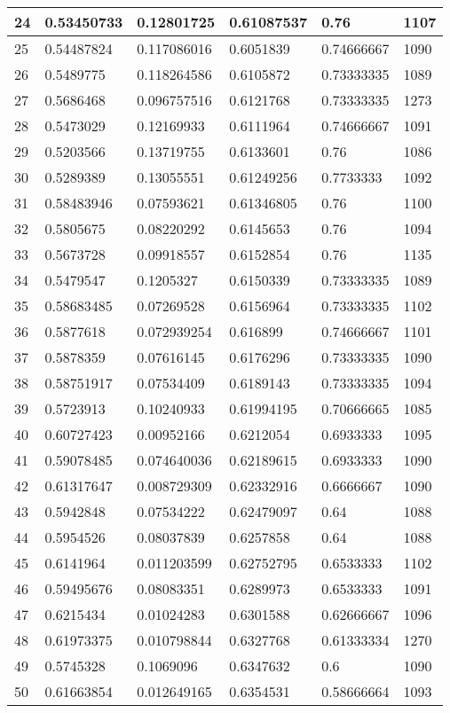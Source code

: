 \begin{longtable}{|l|l|l|l|l|l|}
24 & 0.53450733 & 0.12801725 & 0.61087537 & 0.76 & 1107 \\ \hline 
25 & 0.54487824 & 0.117086016 & 0.6051839 & 0.74666667 & 1090 \\ \hline 
26 & 0.5489775 & 0.118264586 & 0.6105872 & 0.73333335 & 1089 \\ \hline 
27 & 0.5686468 & 0.096757516 & 0.6121768 & 0.73333335 & 1273 \\ \hline 
28 & 0.5473029 & 0.12169933 & 0.6111964 & 0.74666667 & 1091 \\ \hline 
29 & 0.5203566 & 0.13719755 & 0.6133601 & 0.76 & 1086 \\ \hline 
30 & 0.5289389 & 0.13055551 & 0.61249256 & 0.7733333 & 1092 \\ \hline 
31 & 0.58483946 & 0.07593621 & 0.61346805 & 0.76 & 1100 \\ \hline 
32 & 0.5805675 & 0.08220292 & 0.6145653 & 0.76 & 1094 \\ \hline 
33 & 0.5673728 & 0.09918557 & 0.6152854 & 0.76 & 1135 \\ \hline 
34 & 0.5479547 & 0.1205327 & 0.6150339 & 0.73333335 & 1089 \\ \hline 
35 & 0.58683485 & 0.07269528 & 0.6156964 & 0.73333335 & 1102 \\ \hline 
36 & 0.5877618 & 0.072939254 & 0.616899 & 0.74666667 & 1101 \\ \hline 
37 & 0.5878359 & 0.07616145 & 0.6176296 & 0.73333335 & 1090 \\ \hline 
38 & 0.58751917 & 0.07534409 & 0.6189143 & 0.73333335 & 1094 \\ \hline 
39 & 0.5723913 & 0.10240933 & 0.61994195 & 0.70666665 & 1085 \\ \hline 
40 & 0.60727423 & 0.00952166 & 0.6212054 & 0.6933333 & 1095 \\ \hline 
41 & 0.59078485 & 0.074640036 & 0.62189615 & 0.6933333 & 1090 \\ \hline 
42 & 0.61317647 & 0.008729309 & 0.62332916 & 0.6666667 & 1090 \\ \hline 
43 & 0.5942848 & 0.07534222 & 0.62479097 & 0.64 & 1088 \\ \hline 
44 & 0.5954526 & 0.08037839 & 0.6257858 & 0.64 & 1088 \\ \hline 
45 & 0.6141964 & 0.011203599 & 0.62752795 & 0.6533333 & 1102 \\ \hline 
46 & 0.59495676 & 0.08083351 & 0.6289973 & 0.6533333 & 1091 \\ \hline 
47 & 0.6215434 & 0.01024283 & 0.6301588 & 0.62666667 & 1096 \\ \hline 
48 & 0.61973375 & 0.010798844 & 0.6327768 & 0.61333334 & 1270 \\ \hline 
49 & 0.5745328 & 0.1069096 & 0.6347632 & 0.6 & 1090 \\ \hline 
50 & 0.61663854 & 0.012649165 & 0.6354531 & 0.58666664 & 1093 \\ \hline 
\end{longtable}